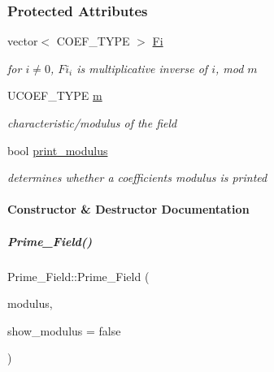 \subsubsection*{Protected Attributes}
\begin{DoxyCompactItemize}
\item 
\mbox{\label{group___fields_group_acbcc0858cd26489bd5837d491788a734}} 
vector$<$ C\+O\+E\+F\+\_\+\+T\+Y\+PE $>$ \hyperlink{group___fields_group_acbcc0858cd26489bd5837d491788a734}{Fi}
\begin{DoxyCompactList}\small\item\em for $i\neq0$, $Fi_i$ is multiplicative inverse of $i$, mod $m$ \end{DoxyCompactList}\item 
\mbox{\label{group___fields_group_a0fa882a2952f67bf7e071b6f491d6075}} 
U\+C\+O\+E\+F\+\_\+\+T\+Y\+PE \hyperlink{group___fields_group_a0fa882a2952f67bf7e071b6f491d6075}{m}
\begin{DoxyCompactList}\small\item\em characteristic/modulus of the field \end{DoxyCompactList}\item 
\mbox{\label{group___fields_group_ab9ea57c2214d84d29908b445423bb57b}} 
bool \hyperlink{group___fields_group_ab9ea57c2214d84d29908b445423bb57b}{print\+\_\+modulus}
\begin{DoxyCompactList}\small\item\em determines whether a coefficient\textquotesingle{}s modulus is printed \end{DoxyCompactList}\end{DoxyCompactItemize}


\paragraph{Constructor \& Destructor Documentation}
\mbox{\label{group___fields_group_a2a127ad161be0d732921c7a4bbd19779}} 
\subparagraph{\texorpdfstring{Prime\+\_\+\+Field()}{Prime\_Field()}\hspace{0.1cm}{\footnotesize\ttfamily [1/2]}}
{\footnotesize\ttfamily Prime\+\_\+\+Field\+::\+Prime\+\_\+\+Field (\begin{DoxyParamCaption}\item[{U\+C\+O\+E\+F\+\_\+\+T\+Y\+PE}]{modulus,  }\item[{bool}]{show\+\_\+modulus = {\ttfamily false} }\end{DoxyParamCaption})}



